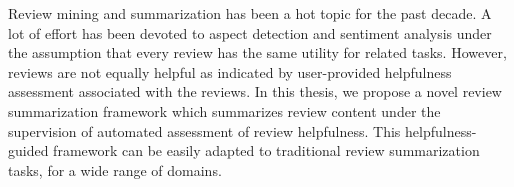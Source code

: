 Review mining and summarization has been a hot topic for the past decade. A lot of effort has been devoted to aspect detection and sentiment analysis under the
 assumption that every review has the same utility for related tasks. However,
 reviews are not equally helpful as indicated by user-provided helpfulness
 assessment associated with the reviews. In this thesis, we propose a novel
 review summarization framework which summarizes review content under the
 supervision of automated assessment of review helpfulness. This
 helpfulness-guided framework can be easily adapted to traditional review
 summarization tasks, for a wide range of domains.

